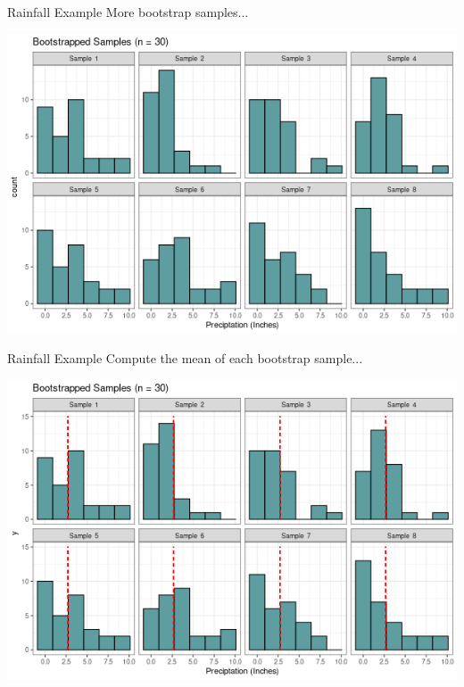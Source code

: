 \documentclass{beamer}
\begin{document}
\begin{frame}{Rainfall Example}
More bootstrap samples...
\begin{center}
\includegraphics[scale=0.5]{grin_rain_boot2.png}
\end{center}
\end{frame}

\begin{frame}{Rainfall Example}
Compute the mean of each bootstrap sample...
\begin{center}
\includegraphics[scale=0.5]{grin_rain_boot3.png}
\end{center}
\end{frame}
\end{document}
